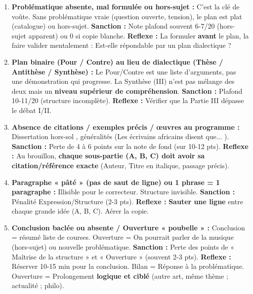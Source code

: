 \documentclass[11pt]{article}
\newcommand{\cle}[1]{{\popxbold\color{popdark}#1}}
\begin{document}
\begin{attention}
    \begin{enumerate}
        \item \textbf{Problématique absente, mal formulée ou hors-sujet :} C'est la \cle{clé de voûte}. Sans problématique vraie (question ouverte, tension), le plan est plat (catalogue) ou hors-sujet. \textbf{Sanction :} Note plafond souvent 6-7/20 (hors-sujet apparent) ou 0 si copie blanche. \textbf{Reflexe :} La formuler \textbf{avant} le plan, la faire valider mentalement : \og Est-elle répondable par un plan dialectique ? \fg
        \item \textbf{Plan binaire (Pour / Contre) au lieu de dialectique (Thèse / Antithèse / Synthèse) :} Le \og Pour/Contre \fg est une liste d'arguments, pas une démonstration qui progresse. La Synthèse (III) n'est pas \og mélange des deux \fg mais un \textbf{niveau supérieur de compréhension}. \textbf{Sanction :} Plafond 10-11/20 (structure incomplète). \textbf{Reflexe :} Vérifier que la Partie III \og dépasse \fg le débat I/II.
        \item \textbf{Absence de citations / exemples précis / œuvres au programme :} Dissertation \og hors-sol \fg, généralités (\og Les écrivains africains disent que... \fg). \textbf{Sanction :} Perte de 4 à 6 points sur la note de fond (sur 10-12 pts). \textbf{Reflexe :} Au brouillon, \textbf{chaque sous-partie (A, B, C) doit avoir sa citation/référence exacte} (Auteur, Titre en italique, passage précis).
        \item \textbf{Paragraphe « pâté » (pas de saut de ligne) ou 1 phrase = 1 paragraphe :} Illisible pour le correcteur. Structure invisible. \textbf{Sanction :} Pénalité Expression/Structure (2-3 pts). \textbf{Reflexe :} \textbf{Sauter une ligne} entre chaque grande idée (A, B, C). Aérer la copie.
        \item \textbf{Conclusion baclée ou absente / Ouverture « poubelle » :} Conclusion = résumé liste de courses. Ouverture = \og On pourrait parler de la musique \fg (hors-sujet) ou nouvelle problématique. \textbf{Sanction :} Perte des points de « Maîtrise de la structure » et « Ouverture » (souvent 2-3 pts). \textbf{Reflexe :} Réserver 10-15 min pour la conclusion. Bilan = Réponse à la problématique. Ouverture = Prolongement \textbf{logique et ciblé} (autre art, même thème ; actualité ; philo).
    \end{enumerate}
\end{attention}
\end{document}

